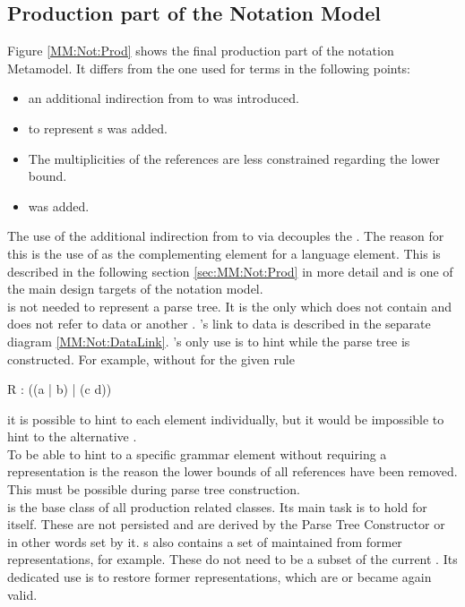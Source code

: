 \subsection{Production part of the Notation Model}
Figure \ref{MM:Not:Prod} shows the final production part of the notation Metamodel. It differs from the one used for terms in the following points:
\begin{itemize}
	\item an additional indirection from  to  was introduced. 
	\item {} to represent s was added.
	\item The multiplicities of the references are less constrained regarding the lower bound.
	\item {} was added.
\end{itemize}
The use of the additional indirection from  to  via  decouples the . The reason for this is the use of  as the complementing element for a language element. This is described in the following section \ref{sec:MM:Not:Prod} in more detail and is one of the main design targets of the notation model.\\
 is not needed to represent a parse tree. It is the only  which does not contain and does not refer to data or another . 's link to data is described in the separate diagram \ref{MM:Not:DataLink}. 's only use is to hint while the parse tree is constructed. For example, without  for the given rule
\begin{xtxt}
R : ((a | b) | (c d)) 
\end{xtxt}
it is possible to hint to each element individually, but it would be impossible to hint to the alternative . \\
To be able to hint to a specific grammar element without requiring a representation is the reason the lower bounds of all references have been removed. This must be possible during parse tree construction.\\
 is the base class of all production related classes. Its main task is to hold  for itself. These  are not persisted and are derived by the Parse Tree Constructor or in other words set by it. s also contains a set of  maintained from former representations, for example. These do not need to be a subset of the current . Its dedicated use is to restore former representations, which are or became again valid.


